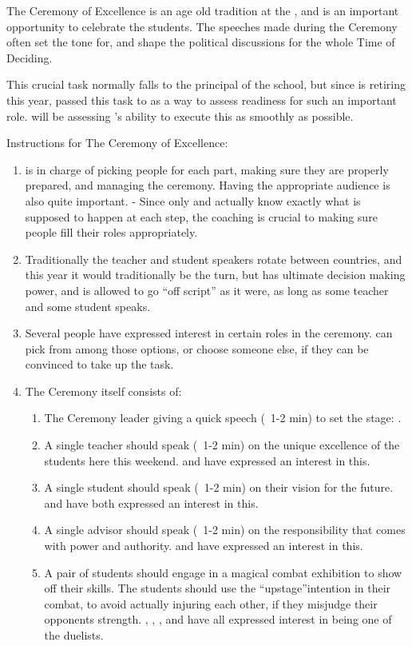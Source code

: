 \documentclass[green]{GL2020}
\begin{document}
\name{\gCeremonyOfExcellence{}}

The Ceremony of Excellence is an age old tradition at the \pSchool{}, and is an important opportunity to celebrate the students. The speeches made during the Ceremony often set the tone for, and shape the political discussions for the whole Time of Deciding.

This crucial task normally falls to the principal of the school, but since \cPrincipal{\full} is retiring this year, \cPrincipal{\they} \cPrincipal{\have} passed this task to \cMusic{\full} as a way to assess \cMusic{\their} readiness for such an important role. \cPrincipal{} will be assessing \cMusic{}’s ability to execute this as smoothly as possible.

Instructions for The Ceremony of Excellence:
\begin{enumerate}
  \item \cMusic{} is in charge of picking people for each part, making sure they are properly prepared, and managing the ceremony. Having the appropriate audience is also quite important. - Since only \cMusic{} and \cPrincipal{} actually know exactly what is supposed to happen at each step, the coaching is crucial to making sure people fill their roles appropriately.
  \item Traditionally the teacher and student speakers rotate between countries, and this year it would traditionally be the \pShippies{} turn, but \cMusic{} has ultimate decision making power, and is allowed to go ``off script'' as it were, as long as some teacher and some student speaks.
  \item Several people have expressed interest in certain roles in the ceremony. \cMusic{} can pick from among those options, or choose someone else, if they can be convinced to take up the task.
  \item The Ceremony itself consists of:
  \begin{enumerate}
    \item The Ceremony leader giving a quick speech (~1-2 min) to set the stage: \cMusic{}.
    \item A single teacher should speak (~1-2 min) on the unique excellence of the students here this weekend. \cFlowPriest{\full} and \cPirate{\full} have expressed an interest in this.
    \item A single student should speak (~1-2 min) on their vision for the future. \cWarlordDaughter{\full} and \cPirateChild{\full} have both expressed an interest in this.
    \item A single advisor should speak (~1-2 min) on the responsibility that comes with power and authority. \cHedonist{\full} and \cCurse{\full} have expressed an interest in this.
    \item A pair of students should engage in a magical combat exhibition to show off their skills. The students should use the “upstage”intention in their combat, to avoid actually injuring each other, if they misjudge their opponents strength. \cTechStar{\full}, \cHeir{\full}, \cLibAssist{\full}, and \cAmbition{\full} have all expressed interest in being one of the duelists.
  \end{enumerate}
\end{enumerate}
\end{document}
